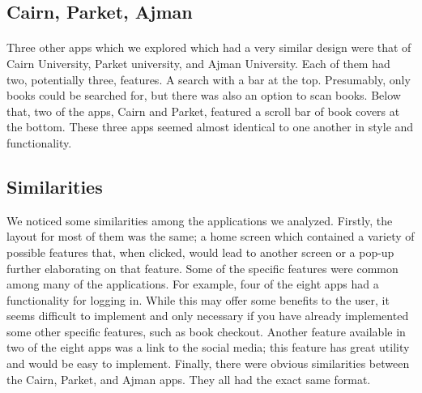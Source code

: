             \paragraph{}
        \subsection{Cairn, Parket, Ajman}
            \paragraph{}
            Three other apps which we explored which had a very similar design were that of Cairn University, Parket university, and Ajman University. Each of them had two, potentially three, features. A search with a bar at the top. Presumably, only books could be searched for, but there was also an option to scan books. Below that, two of the apps, Cairn and Parket, featured a scroll bar of book covers at the bottom. These three apps seemed almost identical to one another in style and functionality. 
            
            
        \subsection{Similarities}
        We noticed some similarities among the  applications we analyzed. Firstly, the layout for most of them was the same; a home screen which contained a variety of possible features that, when clicked, would lead to another screen or a pop-up further elaborating on that feature. Some of the specific features were common among many of the applications. For example, four of the eight apps had a functionality for logging in. While this may offer some benefits to the user, it seems difficult to implement and only necessary if you have already implemented some other specific features, such as book checkout. Another feature available in two of the eight apps was a link to the social media; this feature has great utility and would be easy to implement. Finally, there were obvious similarities between the Cairn, Parket, and Ajman apps. They all had the exact same format.
    